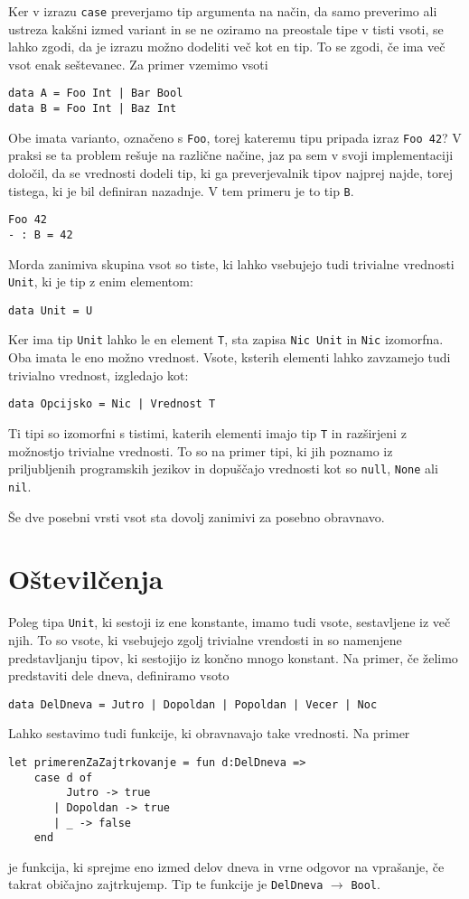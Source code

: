 \documentclass[12pt,a4paper,openany]{book}
\begin{document}
Ker v izrazu \lstinline{case} preverjamo tip argumenta na način, da samo preverimo ali ustreza kakšni izmed variant in se ne oziramo na preostale tipe v tisti vsoti, 
se lahko zgodi, da je izrazu možno dodeliti več kot en tip. To se zgodi, če ima več vsot enak seštevanec. Za primer vzemimo vsoti
\begin{lstlisting}
data A = Foo Int | Bar Bool
data B = Foo Int | Baz Int
\end{lstlisting}
Obe imata varianto, označeno s \lstinline{Foo}, torej kateremu tipu pripada izraz \lstinline{Foo 42}? V praksi se ta problem rešuje na različne načine, jaz pa sem v svoji implementaciji določil, da se vrednosti 
dodeli tip, ki ga preverjevalnik tipov najprej najde, torej tistega, ki je bil definiran nazadnje. V tem primeru je to tip \lstinline{B}.
\begin{lstlisting}
Foo 42
- : B = 42
\end{lstlisting}

Morda zanimiva skupina vsot so tiste, ki lahko vsebujejo tudi trivialne vrednosti \lstinline{Unit}, ki je tip z enim elementom:
\begin{lstlisting}
data Unit = U
\end{lstlisting}
Ker ima tip \lstinline{Unit} lahko le en element \lstinline{T}, sta zapisa \lstinline{Nic Unit} in \lstinline{Nic} izomorfna. Oba imata le eno možno vrednost. Vsote, ksterih elementi lahko zavzamejo tudi trivialno vrednost, izgledajo kot:
\begin{lstlisting}
data Opcijsko = Nic | Vrednost T
\end{lstlisting}
Ti tipi so izomorfni s tistimi, katerih elementi imajo tip \lstinline{T} in razširjeni z možnostjo trivialne vrednosti. To so na primer tipi, ki jih poznamo iz priljubljenih programskih jezikov in dopuščajo 
vrednosti kot so \lstinline{null}, \lstinline{None} ali \lstinline{nil}.

Še dve posebni vrsti vsot sta dovolj zanimivi za posebno obravnavo.

\section{Oštevilčenja}
Poleg tipa \lstinline{Unit}, ki sestoji iz ene konstante, imamo tudi vsote, sestavljene iz več njih. To so vsote, ki vsebujejo zgolj trivialne vrendosti in so namenjene predstavljanju tipov, ki sestojijo iz končno mnogo konstant. 
Na primer, če želimo predstaviti dele dneva, definiramo vsoto
\begin{lstlisting}
data DelDneva = Jutro | Dopoldan | Popoldan | Vecer | Noc
\end{lstlisting}
Lahko sestavimo tudi funkcije, ki obravnavajo take vrednosti. Na primer
\begin{lstlisting}
let primerenZaZajtrkovanje = fun d:DelDneva =>
    case d of 
         Jutro -> true
       | Dopoldan -> true
       | _ -> false
    end
\end{lstlisting}
je funkcija, ki sprejme eno izmed delov dneva in vrne odgovor na vprašanje, če takrat običajno zajtrkujemp. Tip te funkcije je \lstinline{DelDneva} $\rightarrow$ \lstinline{Bool}.
\end{document}
